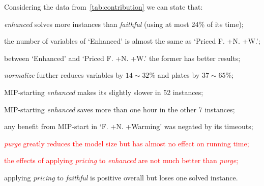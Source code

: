 \documentclass[smallextended]{svjour3}       %
\newif\iffinalversion
\newcommand{\oldtext}[1]{\iffinalversion%
#1%
\else%
\textcolor{red}{#1}%
\fi%
}
\begin{document}
Considering the data from~\autoref{tab:contribution} we can state that:
\begin{enumerate}
\item \emph{enhanced} solves more instances than \emph{faithful} (using at most 24\% of its time);
\item the number of variables of `Enhanced' is almost the same as `Priced F. +N. +W.';
\item between `Enhanced' and `Priced F. +N. +W.' the former has better results;
\item \emph{normalize} further reduces variables by \(14\sim32\)\% and plates by \(37\sim65\)\%;
\item MIP-starting \emph{enhanced} makes its slightly slower in 52 instances;
\item MIP-starting \emph{enhanced} saves more than one hour in the other 7 instances;
\item any benefit from MIP-start in `F. +N. +Warming' was negated by its timeouts;
\oldtext{\item \emph{purge} greatly reduces the model size but has almost no effect on running time;}
\oldtext{\item the effects of applying \emph{pricing} to \emph{enhanced} are not much better than \emph{purge};}
\item applying \emph{pricing} to \emph{faithful} is positive overall but loses one solved instance.
\end{enumerate}
\end{document}
